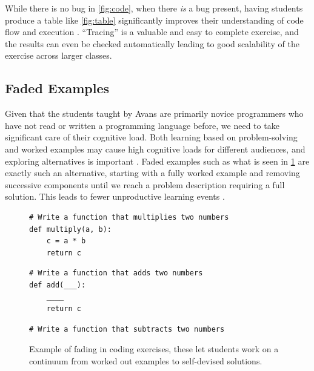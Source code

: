 \documentclass[paper=a4,]{tufte-handout}
\begin{document}
While there is no bug in \cref{fig:code}, when there \emph{is} a bug
present, having students produce a table like \cref{fig:table}
significantly improves their understanding of code flow and execution
\citep{Hertz_2013}. ``Tracing'' is a valuable and easy to complete
exercise, and the results can even be checked automatically leading to
good scalability of the exercise across larger classes.

\hypertarget{faded-examples}{%
\subsection{Faded Examples}\label{faded-examples}}

Given that the students taught by Avans are primarily novice programmers
who have not read or written a programming language before, we need to
take significant care of their cognitive load. Both learning based on
problem-solving and worked examples may cause high cognitive loads for
different audiences, and exploring alternatives is important
\citep{Retnowati_2017}. Faded examples such as what is seen in
\cref{fig:fade} are exactly such an alternative, starting with a fully
worked example and removing successive components until we reach a
problem description requiring a full solution. This leads to fewer
unproductive learning events \citep{Renkl_2004}.

\begin{figure}[ht]
    \begin{minipage}[b]{\linewidth}
\begin{lstlisting}
# Write a function that multiplies two numbers
def multiply(a, b):
    c = a * b
    return c
\end{lstlisting}
    \end{minipage}

    \begin{minipage}[b]{\linewidth}
\begin{lstlisting}
# Write a function that adds two numbers
def add(___):
    ____
    return c
\end{lstlisting}
    \end{minipage}

    \begin{minipage}[b]{\linewidth}
\begin{lstlisting}
# Write a function that subtracts two numbers
\end{lstlisting}
    \end{minipage}

  \caption{Example of fading in coding exercises, these let students work on a continuum from worked out examples to self-devised solutions.\label{fig:fade}}
\end{figure}
\end{document}
